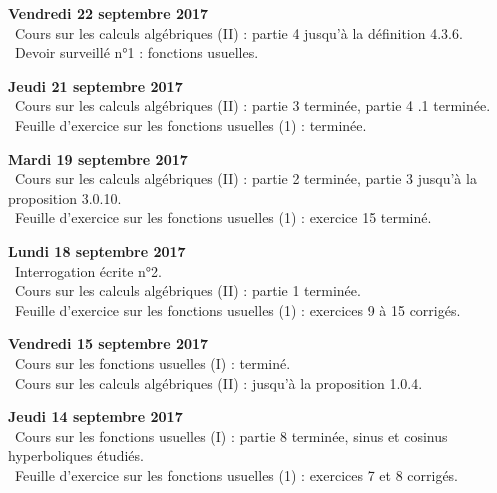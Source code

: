 \documentclass[12pt,a4paper]{article}
\begin{document}
\noindent\textbf{Vendredi 22 septembre 2017}\\
\bu\ Cours sur les calculs algébriques (II) : partie 4 jusqu'à la définition 4.3.6. \\
\bu\ Devoir surveillé n°1 : fonctions usuelles. \\
\vspace{.4cm}

\noindent\textbf{Jeudi 21 septembre 2017}\\
\bu\ Cours sur les calculs algébriques (II) : partie 3 terminée, partie 4 .1 terminée. \\
\bu\ Feuille d'exercice sur les fonctions usuelles (1) : terminée. \\
\vspace{.4cm}

\noindent\textbf{Mardi 19 septembre 2017}\\
\bu\ Cours sur les calculs algébriques (II) : partie 2 terminée, partie 3 jusqu'à la proposition 3.0.10. \\
\bu\ Feuille d'exercice sur les fonctions usuelles (1) : exercice 15 terminé. \\
\vspace{.4cm}

\noindent\textbf{Lundi 18 septembre 2017}\\
\bu\ Interrogation écrite n°2.\\
\bu\ Cours sur les calculs algébriques (II) : partie 1 terminée. \\
\bu\ Feuille d'exercice sur les fonctions usuelles (1) : exercices 9 à 15 corrigés. \\
\vspace{.4cm}

\noindent\textbf{Vendredi 15 septembre 2017}\\
\bu\ Cours sur les fonctions usuelles (I) : terminé. \\
\bu\ Cours sur les calculs algébriques (II) : jusqu'à la proposition 1.0.4. \\
\vspace{.4cm}

\noindent\textbf{Jeudi 14 septembre 2017}\\
\bu\ Cours sur les fonctions usuelles (I) : partie 8 terminée, sinus et cosinus hyperboliques étudiés. \\
\bu\ Feuille d'exercice sur les fonctions usuelles (1) : exercices 7 et 8 corrigés. \\
\vspace{.4cm}
\end{document}
